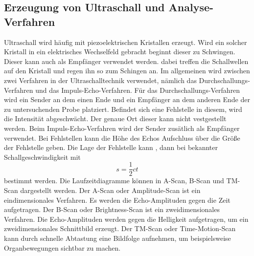 \subsection{Erzeugung von Ultraschall und Analyse-Verfahren}
Ultraschall wird häufig mit piezoelektrischen Kristallen erzeugt.
Wird ein solcher Kristall in ein elektrisches Wechselfeld gebracht beginnt dieser zu Schwingen.
Dieser kann auch als Empfänger verwendet werden. dabei treffen die Schallwellen auf den Kristall und regen ihn so zum Schingen an.
Im allgemeinen wird zwischen zwei Verfahren in der Ultraschalltechnik verwendet, nämlich das Durchschallungs-Verfahren und das Impuls-Echo-Verfahren.
Für das Durchschallungs-Verfahren wird ein Sender an dem einen Ende und ein Empfänger an dem anderen Ende der zu untersuchenden Probe platziert.
Befindet sich eine Fehlstelle in diesem, wird die Intensität abgeschwächt.
Der genaue Ort dieser kann nicht vestgestellt werden.
Beim Impuls-Echo-Verfahren wird der Sender zusätlich als Empfänger verwendet.
Bei Fehlstellen kann die Höhe des Echos Aufschluss über die Größe der Fehlstelle geben.
Die Lage der Fehlstelle kann , dann bei bekannter Schallgeschwindigkeit mit
\begin{equation}
  s= \frac{1}{2}ct
\end{equation}
bestimmt werden.
Die Laufzeitdiagramme können in A-Scan, B-Scan und TM-Scan dargestellt werden.
Der A-Scan oder Amplitude-Scan ist ein eindimensionales Verfahren.
Es werden die Echo-Amplituden gegen die Zeit aufgetragen.
Der B-Scan oder Brightness-Scan ist ein zweidimensionales Verfahren.
Die Echo-Amplituden werden gegen die Helligkeit aufgetragen, um ein zweidimensionales Schnittbild erzeugt.
Der TM-Scan oder Time-Motion-Scan kann durch schnelle Abtastung eine Bildfolge aufnehmen, um beispielsweise Organbewegungen sichtbar zu machen.
